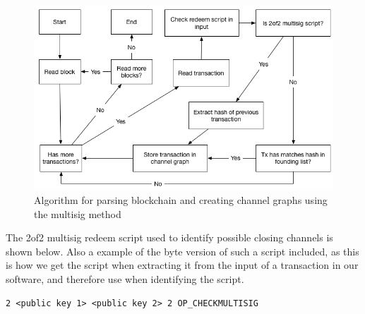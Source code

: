 \begin{figure}[h]
    \centering
    \includegraphics[width=12cm]{figures/algo1.png}
    \caption{Algorithm for parsing blockchain and creating channel graphs using the multisig method}
    \label{fig:algo1}
\end{figure}

The 2of2 multisig redeem script used to identify possible closing channels is shown below. Also a example of the byte version of such a script included, as this is how we get the script when extracting it from the input of a transaction in our software, and therefore use when identifying the script.

\begin{verbatim}
2 <public key 1> <public key 2> 2 OP_CHECKMULTISIG
\end{verbatim}

\noindent [82 33 2 211 153 245 240 225 125 95 140 116 20 99 81 38 139 135 136 59 14 125 34 181 148 47 67 16 42 24 147 28 144 61 33 33 2 215 1 70 141 233 112 91 253 252 202 27 73 158 254 234 159 125 98 30 78 159 235 6 46 167 103 105 239 180 125 168 66 82 174]
\\

